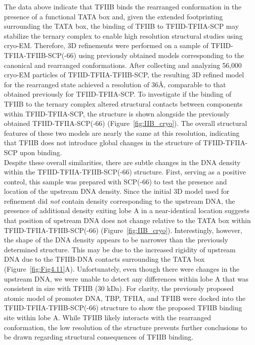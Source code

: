 \indent The data above indicate that TFIIB binds the rearranged conformation in the presence of a functional TATA box and, given the extended footprinting surrounding the TATA box, the binding of TFIIB to TFIID-TFIIA-SCP may stabilize the ternary complex to enable high resolution structural studies using cryo-EM. Therefore, 3D refinements were performed on a sample of TFIID-TFIIA-TFIIB-SCP(-66) using previously obtained models corresponding to the canonical and rearranged conformations. After collecting and analyzing 56,000 cryo-EM particles of TFIID-TFIIA-TFIIB-SCP, the resulting 3D refined model for the rearranged state achieved a resolution of 36\AA, comparable to that obtained previously for TFIID-TFIIA-SCP. To investigate if the binding of TFIIB to the ternary complex altered structural contacts between components within TFIID-TFIIA-SCP, the structure is shown alongside the previously obtained TFIID-TFIIA-SCP(-66) (Figure~\ref{fig:IIB_cryo}). The overall structural features of these two models are nearly the same at this resolution, indicating that TFIIB does not introduce global changes in the structure of TFIID-TFIIA-SCP upon binding. \\
\indent Despite these overall similarities, there are subtle changes in the DNA density within the TFIID-TFIIA-TFIIB-SCP(-66) structure. First, serving as a positive control, this sample was prepared with SCP(-66) to test the presence and location of the upstream DNA density. Since the initial 3D model used for refinement did \emph{not} contain density corresponding to the upstream DNA, the presence of additional density exiting lobe A in a near-identical location suggests that position of upstream DNA does not change relative to the TATA box within TFIID-TFIIA-TFIIB-SCP(-66) (Figure~\ref{fig:IIB_cryo}). Interestingly, however, the shape of the DNA density appears to be narrower than the previously determined structure. This may be due to the increased rigidity of upstream DNA due to the TFIIB-DNA contacts surrounding the TATA box (Figure~\ref{fig:Fig4.11}A). Unfortunately, even though there were changes in the upstream DNA, we were unable to detect any differences within lobe A that was consistent in size with TFIIB (30 kDa). For clarity, the previously proposed atomic model of promoter DNA, TBP, TFIIA, and TFIIB were docked into the TFIID-TFIIA-TFIIB-SCP(-66) structure to show the proposed TFIIB binding site within lobe A. While TFIIB likely interacts with the rearranged conformation, the low resolution of the structure prevents further conclusions to be drawn regarding structural consequences of TFIIB binding. \\
